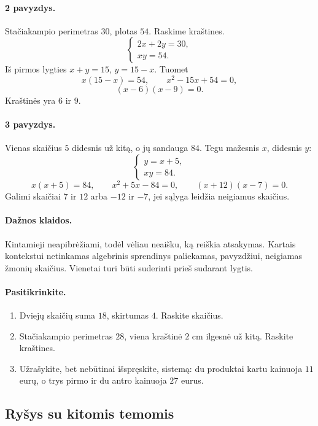 \paragraph{2 pavyzdys.}
Stačiakampio perimetras $30$, plotas $54$. Raskime kraštines.
\[
\begin{cases}
2x+2y=30,\\
xy=54.
\end{cases}
\]
Iš pirmos lygties $x+y=15$, $y=15-x$. Tuomet
\[
x(15-x)=54,\qquad x^2-15x+54=0,
\]
\[
(x-6)(x-9)=0.
\]
Kraštinės yra $6$ ir $9$.

\paragraph{3 pavyzdys.}
Vienas skaičius $5$ didesnis už kitą, o jų sandauga $84$. Tegu mažesnis $x$, didesnis $y$:
\[
\begin{cases}
y=x+5,\\
xy=84.
\end{cases}
\]
\[
x(x+5)=84,\qquad x^2+5x-84=0,\qquad (x+12)(x-7)=0.
\]
Galimi skaičiai $7$ ir $12$ arba $-12$ ir $-7$, jei sąlyga leidžia neigiamus skaičius.

\paragraph{Dažnos klaidos.}
Kintamieji neapibrėžiami, todėl vėliau neaišku, ką reiškia atsakymas. Kartais kontekstui netinkamas algebrinis sprendinys paliekamas, pavyzdžiui, neigiamas žmonių skaičius. Vienetai turi būti suderinti prieš sudarant lygtis.

\paragraph{Pasitikrinkite.}
\begin{enumerate}
\item Dviejų skaičių suma $18$, skirtumas $4$. Raskite skaičius.
\item Stačiakampio perimetras $28$, viena kraštinė $2$ cm ilgesnė už kitą. Raskite kraštines.
\item Užrašykite, bet nebūtinai išspręskite, sistemą: du produktai kartu kainuoja $11$ eurų, o trys pirmo ir du antro kainuoja $27$ eurus.
\end{enumerate}

\subsection{Ryšys su kitomis temomis}

